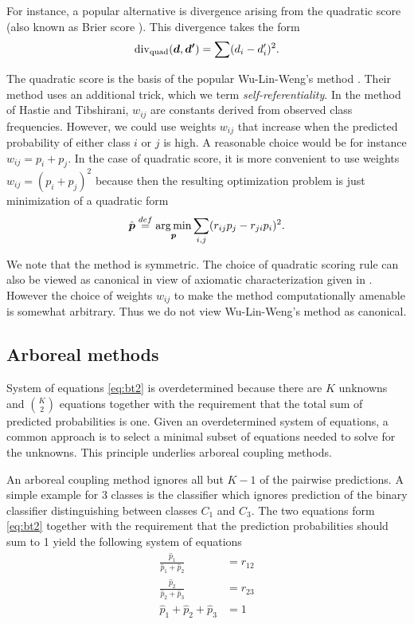 For instance, a popular alternative is divergence arising from the quadratic  score \cite{gneiting2007strictly} (also known as Brier score \cite{brier1950verification}). This divergence takes the form
$$
\operatorname*{div}\nolimits_\textrm{quad} (\boldsymbol{d}, \boldsymbol{d'})= \sum (d_i - d'_i)^2.
$$

The quadratic score is the basis of the popular Wu-Lin-Weng's method \cite{wu2004probability}. 
Their method uses an additional trick, which we term \emph{self-referentiality}. In the method of Hastie and Tibshirani, $w_{ij}$ are constants derived from observed class frequencies. However, we could use weights $w_{ij}$ that increase when the predicted probability of either class $i$ or $j$ is high. A reasonable choice would be for instance $w_{ij}= p_i + p_j$. In the case of quadratic score, it is more convenient to use weights $w_{ij} = (p_i + p_j)^2$ because then the resulting optimization problem is just minimization of a quadratic form
\begin{align*}
\hat{\boldsymbol{p}} \stackrel{def}{=} \operatorname*{arg\,min}_{\boldsymbol{p}} \sum_{i,j} (r_{ij}p_j - r_{ji}p_i)^2.
\end{align*}

We note that the method is symmetric. The choice of quadratic scoring rule can also be viewed as canonical in view of axiomatic characterization given in  \cite{selten1998axiomatic}.  However the choice of weights $w_{ij}$ to make the method computationally amenable is somewhat arbitrary. Thus we do not view Wu-Lin-Weng's method as canonical.

\subsection{Arboreal methods}

System of equations \eqref{eq:bt2} is overdetermined because there are $K$ unknowns and $\binom{K}{2}$ equations together with the requirement that the total sum of predicted probabilities is one.  Given an overdetermined system of equations, a common approach is to select a minimal subset of equations needed to solve for the unknowns. This principle underlies arboreal coupling methods.

An arboreal coupling method ignores all but $K-1$ of the pairwise predictions. A simple example for 3 classes is the classifier which ignores prediction of the binary classifier distinguishing between classes $C_1$ and $C_3$. The two equations form \eqref{eq:bt2} together with the requirement that the prediction probabilities should sum to 1 yield the following system of equations
\begin{equation}
	\begin{split}
		\frac{\hat p_1}{\hat p_1 + \hat p_2} &= {r}_{12}\\
		\frac{\hat p_2}{\hat p_2 + \hat p_3} &= {r}_{23}\\
		\hat p_1 + \hat p_2 + \hat p_3 &= 1
	\end{split}
	\label{eq:arb1}
\end{equation}

